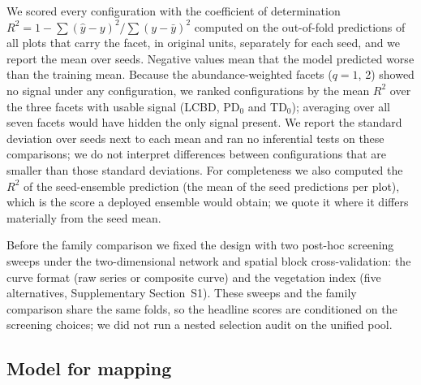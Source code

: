 \documentclass[preprint,12pt]{elsarticle}
\begin{document}
We scored every configuration with the coefficient of determination
$R^2 = 1 - \sum(\hat{y}-y)^2/\sum(y-\bar{y})^2$ computed on the out-of-fold predictions of
all plots that carry the facet, in original units, separately for each seed, and we report
the mean over seeds. Negative values mean that the model predicted worse than the training
mean. Because the abundance-weighted facets ($q = 1$, 2) showed no signal under any
configuration, we ranked configurations by the mean $R^2$ over the three facets with usable
signal (LCBD, PD$_0$ and TD$_0$); averaging over all seven facets would have hidden the only
signal present. We report the standard deviation over seeds next to each mean and ran no
inferential tests on these comparisons; we do not interpret differences between
configurations that are smaller than those standard deviations. For completeness we also
computed the $R^2$ of the seed-ensemble prediction (the mean of the seed predictions per
plot), which is the score a deployed ensemble would obtain; we quote it where it differs
materially from the seed mean.

Before the family comparison we fixed the design with two post-hoc screening sweeps under
the two-dimensional network and spatial block cross-validation: the curve format (raw
series or composite curve) and the vegetation index (five alternatives, Supplementary
Section~S1). These sweeps and the family comparison share the same folds,
so the headline scores are conditioned on the screening choices; we did not run a nested
selection audit on the unified pool.

\subsection{Model for mapping}
\label{sec:finalmodel}
\end{document}
